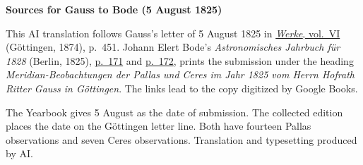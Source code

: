\clearpage\thispagestyle{empty}
\begin{center}\textbf{Sources for Gauss to Bode (5 August 1825)}\end{center}
\noindent This AI translation follows Gauss’s letter of 5 August 1825 in \href{https://gdz.sub.uni-goettingen.de/id/PPN236007467}{\textit{Werke}, vol.~VI} (Göttingen, 1874), p.~451. Johann Elert Bode’s \textit{Astronomisches Jahrbuch für 1828} (Berlin, 1825), \href{https://books.google.nl/books?id=GDAPAAAAQAAJ&pg=PA171&redir_esc=y}{p.~171} and \href{https://books.google.nl/books?id=GDAPAAAAQAAJ&pg=PA172&redir_esc=y}{p.~172}, prints the submission under the heading \textit{Meridian-Beobachtungen der Pallas und Ceres im Jahr 1825 vom Herrn Hofrath Ritter Gauss in Göttingen}. The links lead to the copy digitized by Google Books.
\par\smallskip\noindent The Yearbook gives 5 August as the date of submission. The collected edition places the date on the Göttingen letter line. Both have fourteen Pallas observations and seven Ceres observations. Translation and typesetting produced by AI.
\clearpage
